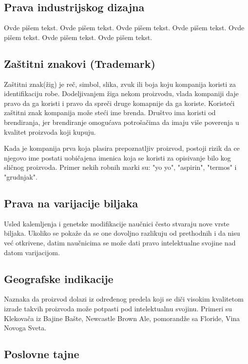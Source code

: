 \documentclass[a4paper]{article}
\begin{document}
\subsection{Prava industrijskog dizajna}
\label{subsec:dizajn}

Ovde pišem tekst. 
Ovde pišem tekst. 
Ovde pišem tekst. 
Ovde pišem tekst. 
Ovde pišem tekst. 
Ovde pišem tekst. 
Ovde pišem tekst. 

\subsection{Zaštitni znakovi (Trademark)}
\label{subsec:trademark}

Zaštitni znak(žig) je reč, simbol, slika, zvuk ili boja koju kompanija koristi za identifikaciju robe. Dodeljivanjem žiga nekom proizvodu, vlada kompaniji daje pravo da ga koristi i pravo da spreči druge komapnije da ga koriste. Koristeći zaštitni znak kompanija može steći ime brenda. Društvo ima koristi od brendiranja, jer brendiranje omogućava potrošačima da imaju više poverenja u kvalitet proizvoda koji kupuju. 

Kada je kompanija prva koja plasira prepoznatljiv proizvod, postoji rizik da ce njegovo ime postati uobičajena imenica koja se koristi za opisivanje bilo kog sličnog proizvoda. Primer nekih robnih marki su: "yo yo", "aspirin", "termos" i "grudnjak".

\subsection{Prava na varijacije biljaka}
\label{subsec:granje}

Usled kalemljenja i genetske modifikacije naučnici često stvaraju nove vrste biljaka. Ukoliko se pokaže da se one dovoljno razlikuju od prethodnih i da nisu već otkrivene, datim naučnicima se može dati pravo intelektualne svojine nad datom varijacijom.

\subsection{Geografske indikacije}
\label{subsec:geo}

Naznaka da proizvod dolazi iz određenog predela koji se diči visokim kvalitetom izrade takvih proizvoda može potpasti pod intelektualnu svojinu. Primeri su Klekovača iz Bajine Bašte, Newcastle Brown Ale, pomorandže sa Floride, Vina Novoga Sveta.

\subsection{Poslovne tajne}
\label{subsec:poslovne}
\end{document}

